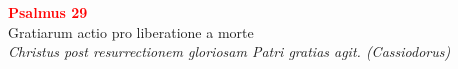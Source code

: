 


\def\greinitialformat#1{%
{\fontsize{39}{39}\selectfont #1}%
}




\vspace{0.3cm}
\begin{center}
 \textcolor{red}{\large \bf Psalmus 29}\\
Gratiarum actio pro liberatione a morte\\
\textit{\small Christus post resurrectionem gloriosam Patri gratias agit. (Cassiodorus)}
\end{center}
